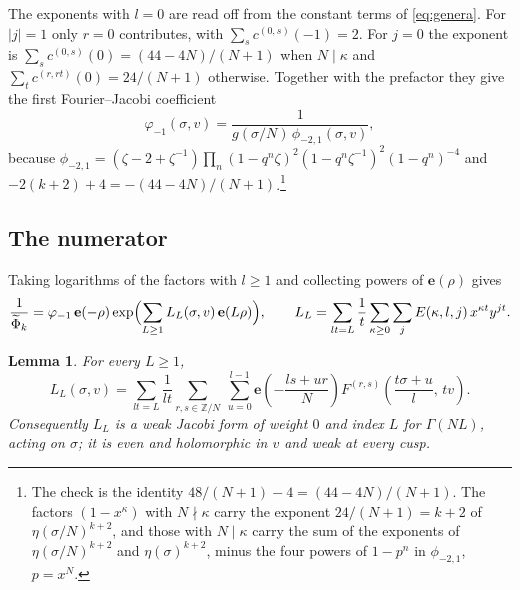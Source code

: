 \documentclass[11pt]{amsart}
\numberwithin{equation}{section}
\theoremstyle{plain}
\newtheorem{lem}[thm]{Lemma}
\theoremstyle{remark}
\newcommand{\Z}{\mathbb{Z}}
\newcommand{\e}{\mathbf{e}}
\newcommand{\pmi}{\phi_{-2,1}}
\newcommand{\tPhi}{\widetilde{\Phi}}
\begin{document}
The exponents with $l=0$ are read off from the constant terms of \eqref{eq:genera}. For $|j|=1$ only $r=0$ contributes, with $\sum_s c^{(0,s)}(-1)=2$. For $j=0$ the exponent is $\sum_sc^{(0,s)}(0)=(44-4N)/(N+1)$ when $N\mid\kappa$ and $\sum_t c^{(r,rt)}(0)=24/(N+1)$ otherwise. Together with the prefactor they give the first Fourier--Jacobi coefficient
\begin{equation}\label{eq:phim1}
\varphi_{-1}(\sigma,v)=\frac{1}{g(\sigma/N)\,\pmi(\sigma,v)},
\end{equation}
because $\pmi=(\zeta-2+\zeta^{-1})\prod_n(1-q^n\zeta)^2(1-q^n\zeta^{-1})^2(1-q^n)^{-4}$ and $-2(k+2)+4=-(44-4N)/(N+1)$.\footnote{The check is the identity $48/(N+1)-4=(44-4N)/(N+1)$. The factors $(1-x^\kappa)$ with $N\nmid\kappa$ carry the exponent $24/(N+1)=k+2$ of $\eta(\sigma/N)^{k+2}$, and those with $N\mid\kappa$ carry the sum of the exponents of $\eta(\sigma/N)^{k+2}$ and $\eta(\sigma)^{k+2}$, minus the four powers of $1-p^n$ in $\pmi$, $p=x^N$.}

\subsection{The numerator}
Taking logarithms of the factors with $l\ge1$ and collecting powers of $\e(\rho)$ gives
\begin{equation}\label{eq:exp}
\frac{1}{\tPhi_k}=\varphi_{-1}\,\e(-\rho)\exp\Bigl(\sum_{L\ge1}L_L(\sigma,v)\,\e(L\rho)\Bigr),
\qquad L_L=\sum_{lt=L}\frac1t\sum_{\kappa\ge0}\sum_jE(\kappa,l,j)\,x^{\kappa t}y^{jt}.
\end{equation}

\begin{lem}\label{lem:hecke}
For every $L\ge1$,
\[
L_L(\sigma,v)=\sum_{lt=L}\frac{1}{lt}\sum_{r,s\in\Z/N}\ \sum_{u=0}^{l-1}\e\!\left(-\frac{ls+ur}{N}\right)F^{(r,s)}\!\left(\frac{t\sigma+u}{l},\,tv\right).
\]
Consequently $L_L$ is a weak Jacobi form of weight $0$ and index $L$ for $\Gamma(NL)$, acting on $\sigma$; it is even and holomorphic in $v$ and weak at every cusp.
\end{lem}
\end{document}
